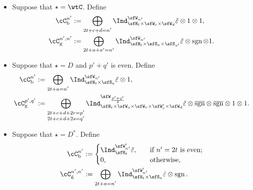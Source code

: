 \documentclass[12pt,a4paper]{amsart}
\newcommand{\Res}{\mathrm{Res}}
\newcommand{\sgn}{\operatorname{sgn}}
\numberwithin{equation}{section}
\theoremstyle{remark}
\def\Cint#1{\Coh_{[#1]}}
\def\bsgn{\overline{\sgn}}
\def\Coh{\mathrm{Coh}}
\begin{document}
\begin{itemize}
\[\begin{split}
        \end{split}
        \]
  \item Suppose that $\star=\wtC$. Define
        \[
        \begin{split}
          \cC_{\mathrm b}^{n'} &
          :=\bigoplus_{\substack{2t+c+d=n'}} %
          \Ind_{\sfH_{t} \times \sfW_c\times \sfW_{d}}^{\sfW_{n'}}\tilde{\varepsilon}\otimes 1 \otimes
          1, %
          \\
          \cC_{\mathrm g}^{n',n'} &:= \bigoplus_{2t+a+a'=n'}\Ind_{\sfH_{t} \times \sfS_{a} \times \sfS_{a'}}^{\sfW_{n'}}\tilde{\varepsilon} \otimes
          \sgn \otimes 1. \\
        \end{split}
        \]
  \item Suppose that $\star=D$ and $p'+q'$ is even. Define
        \[
        \begin{split}
          \cC_{\mathrm b}^{n'} & := \bigoplus_{\substack{2t+a=n'}}
          \Ind_{\sfH_{t}\times \sfS_{a}}^{\sfW_{n'}}\tilde{\varepsilon}\otimes 1,\\
          \cC_{\mathrm g}^{p',q'} %
          & := \bigoplus_{\substack{2t+c+d+2r=p'\\2t+c+d+2s=q'}}
          \Ind_{\sfH_{t} \times \sfW_s\times \sfW_r\times \sfW'_{c}\times \sfW_{d} }^{\sfW_{\frac{p'+q'}{2}}}\tilde{\varepsilon} \otimes \bsgn \otimes \bsgn \otimes 1\otimes
          1. %
          \\
        \end{split}
        \]
  \item Suppose that $\star=D^{*}$. Define
        \[
        \begin{split}
          \cC_{\mathrm b}^{n'} & :=
          \begin{cases}
            \Ind_{\sfH_{t}}^{\sfW'_{n'}}\tilde{\varepsilon}, &\quad
            \text{if $n'=2t$ is even}; \\
            0, & \quad \text{otherwise},\\
          \end{cases}\\
          \cC_{\mathrm g}^{n',n'} %
          &:=\bigoplus_{\substack{2t+a=n'}} \Ind_{\sfH_{t} \times \sfS_{a}}^{\sfW'_{n'}}
         \tilde{\varepsilon} \otimes \sgn. \\
        \end{split}
        \]
\end{itemize}
\end{document}
